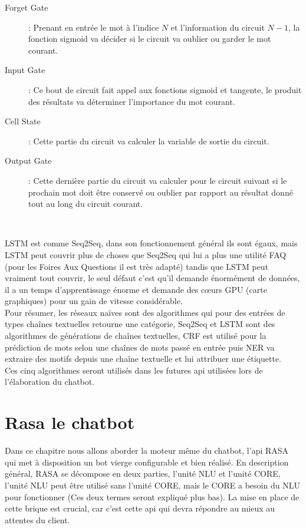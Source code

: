 
\begin{description}
\item[Forget Gate]: Prenant en entrée le mot à l'indice $N$ et l'information du circuit $N-1$, 
la fonction sigmoid va décider si le circuit va oublier ou garder le mot courant. 
\item[Input Gate]: Ce bout de circuit fait appel aux fonctions sigmoid et tangente, le produit des résultats va déterminer l'importance du mot courant.
\item[Cell State]: Cette partie du circuit va calculer la variable de sortie du circuit.
\item[Output Gate]: Cette dernière partie du circuit va calculer pour le circuit suivant si le prochain mot doit être conservé ou oublier par rapport au résultat donné tout au long du circuit courant.
\end{description}
\ \linebreak

LSTM est comme Seq2Seq, dans son fonctionnement général ils sont égaux, mais LSTM peut couvrir plus de choses que Seq2Seq qui lui a plus une utilité FAQ (pour les Foires Aux Questions il est très adapté) tandis que LSTM peut vraiment tout couvrir, le seul défaut c'est qu'il demande énormément de données, il a un temps d'apprentissage énorme et demande des cœurs GPU (carte graphiques) pour un gain de vitesse considérable.\\

\pagebreak
Pour résumer, les réseaux naïves sont des algorithmes qui pour des entrées de types chaînes textuelles retourne une catégorie, Seq2Seq et LSTM sont des algorithmes de générations de chaînes textuelles, CRF est utilisé pour la prédiction de mots selon une chaînes de mots passé en entrée puis NER va extraire des motifs depuis une chaîne textuelle et lui attribuer une étiquette.\\
\linebreak
Ces cinq algorithmes seront utilisés dans les futures api utilisées lors de l'élaboration du chatbot.\\
\pagebreak

\chapter{Rasa le chatbot}

Dans ce chapitre nous allons aborder la moteur même du chatbot, l'api RASA qui met à disposition un bot vierge configurable et bien réalisé. \linebreak
En description général, RASA se décompose en deux parties, l'unité NLU et l'unité CORE, l'unité NLU peut être utilisé sans l'unité CORE, mais le CORE a besoin du NLU pour fonctionner (Ces deux termes seront expliqué plus bas).
La mise en place de cette brique est crucial, car c'est cette api qui devra répondre au mieux au attentes du client.

